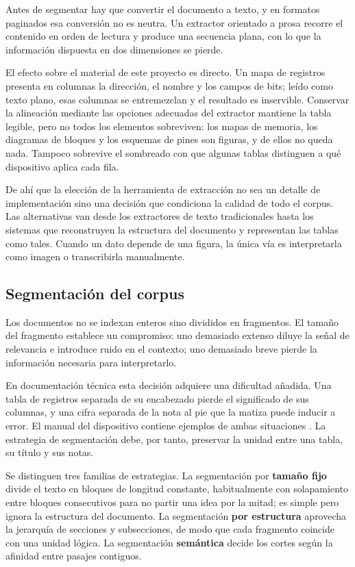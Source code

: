 Antes de segmentar hay que convertir el documento a texto, y en formatos
paginados esa conversión no es neutra. Un extractor orientado a prosa recorre el
contenido en orden de lectura y produce una secuencia plana, con lo que la
información dispuesta en dos dimensiones se pierde.

El efecto sobre el material de este proyecto es directo. Un mapa de registros
presenta en columnas la dirección, el nombre y los campos de bits; leído como
texto plano, esas columnas se entremezclan y el resultado es inservible.
Conservar la alineación mediante las opciones adecuadas del extractor mantiene
la tabla legible, pero no todos los elementos sobreviven: los mapas de memoria,
los diagramas de bloques y los esquemas de pines son figuras, y de ellos no
queda nada. Tampoco sobrevive el sombreado con que algunas tablas distinguen a
qué dispositivo aplica cada fila.

De ahí que la elección de la herramienta de extracción no sea un detalle de
implementación sino una decisión que condiciona la calidad de todo el corpus.
Las alternativas van desde los extractores de texto tradicionales hasta los
sistemas que reconstruyen la estructura del documento y representan las tablas
como tales. Cuando un dato depende de una figura, la única vía es interpretarla
como imagen o transcribirla manualmente.

\subsection{Segmentación del corpus}

Los documentos no se indexan enteros sino divididos en fragmentos. El tamaño del
fragmento establece un compromiso: uno demasiado extenso diluye la señal de
relevancia e introduce ruido en el contexto; uno demasiado breve pierde la
información necesaria para interpretarlo.

En documentación técnica esta decisión adquiere una dificultad añadida. Una
tabla de registros separada de su encabezado pierde el significado de sus
columnas, y una cifra separada de la nota al pie que la matiza puede inducir a
error. El manual del dispositivo contiene ejemplos de ambas situaciones
\cite{microchip2024ds40002043}. La estrategia de segmentación debe, por tanto,
preservar la unidad entre una tabla, su título y sus notas.

Se distinguen tres familias de estrategias. La segmentación por \textbf{tamaño
fijo} divide el texto en bloques de longitud constante, habitualmente con
solapamiento entre bloques consecutivos para no partir una idea por la mitad; es
simple pero ignora la estructura del documento. La segmentación \textbf{por
estructura} aprovecha la jerarquía de secciones y subsecciones, de modo que cada
fragmento coincide con una unidad lógica. La segmentación \textbf{semántica}
decide los cortes según la afinidad entre pasajes contiguos.


